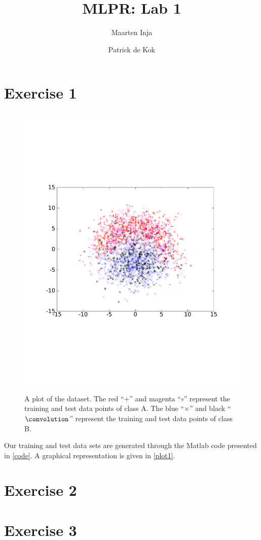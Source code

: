 \documentclass[a4paper,11pt]{article}
\author{Maarten Inja \and Patrick de Kok}
\title{MLPR: Lab 1}
\begin{document}
\maketitle

\section*{Exercise 1}
\begin{figure}[h]
  \caption{A plot of the dataset.  The red ``$+$'' and magenta ``$\circ$'' represent the training and test data points of class A.  The blue ``$\times$'' and black ``$\convolution$'' represent the training and test data points of class B.}
  \label{plot1}
  \begin{center}
    \includegraphics[width=0.6\paperwidth]{plot1}
  \end{center}
\end{figure}

Our training and test data sets are generated through the Matlab code presented in \autoref{code}.  A graphical representation is given in \autoref{plot1}.



\section*{Exercise 2}


\section*{Exercise 3}
\end{document}
